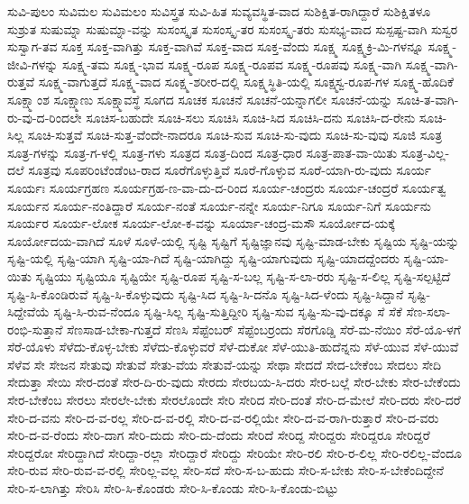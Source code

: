 ಸುವಿ-ಪುಲಂ
ಸುವಿಮಲ
ಸುವಿಮಲಂ
ಸುವಿಸ್ತ್ರತ
ಸುವಿ-ಹಿತ
ಸುವ್ಯವಸ್ಥಿತ-ವಾದ
ಸುಶಿಕ್ಷಿತ-ರಾಗಿದ್ದಾರೆ
ಸುಶಿಕ್ಷಿತಳೂ
ಸುಶ್ರುತ
ಸುಷುಮ್ನಾ
ಸುಷುಮ್ನಾ-ವನ್ನು
ಸುಸಂಸ್ಕೃತ
ಸುಸಂಸ್ಕೃ-ತರ
ಸುಸಂಸ್ಕೃ-ತರು
ಸುಸಭ್ಯ-ವಾದ
ಸುಸ್ಪಷ್ಟ-ವಾಗಿ
ಸುಸ್ವರ
ಸುಸ್ವಾಗ-ತವ
ಸೂಕ್ತ
ಸೂಕ್ತ-ವಾಗಿತ್ತು
ಸೂಕ್ತ-ವಾಗಿವೆ
ಸೂಕ್ತ-ವಾದ
ಸೂಕ್ತ-ವೆಂದು
ಸೂಕ್ಷ್ಮ
ಸೂಕ್ಷ್ಮಕ್ರಿ-ಮಿ-ಗಳನ್ನೂ
ಸೂಕ್ಷ್ಮ-ಜೀವಿ-ಗಳನ್ನು
ಸೂಕ್ಷ್ಮ-ತಮ
ಸೂಕ್ಷ್ಮ-ಭಾವ
ಸೂಕ್ಷ್ಮ-ರೂಪ
ಸೂಕ್ಷ್ಮ-ರೂಪವ
ಸೂಕ್ಷ್ಮ-ರೂಪವು
ಸೂಕ್ಷ್ಮ-ವಾಗಿ
ಸೂಕ್ಷ್ಮ-ವಾಗಿ-ರುತ್ತವೆ
ಸೂಕ್ಷ್ಮ-ವಾಗುತ್ತದೆ
ಸೂಕ್ಷ್ಮ-ವಾದ
ಸೂಕ್ಷ್ಮ-ಶರೀರ-ದಲ್ಲಿ
ಸೂಕ್ಷ್ಮಸ್ಥಿತಿ-ಯಲ್ಲಿ
ಸೂಕ್ಷ್ಮಸ್ವ-ರೂಪ-ಗಳ
ಸೂಕ್ಷ್ಮ-ಹೊದಿಕೆ
ಸೂಕ್ಷ್ಮಾಂಶ
ಸೂಕ್ಷ್ಮಾಣು
ಸೂಕ್ಷ್ಮಾವಸ್ಥೆ
ಸೂಗದ
ಸೂಚಕ
ಸೂಚನೆ
ಸೂಚನೆ-ಯನ್ನಾಗಲೀ
ಸೂಚನೆ-ಯನ್ನು
ಸೂಚಿ-ತ-ವಾಗಿ-ರು-ವು-ದ-ರಿಂದಲೇ
ಸೂಚಿಸ-ಬಹುದೇ
ಸೂಚಿ-ಸಲು
ಸೂಚಿಸಿ
ಸೂಚಿ-ಸಿದ
ಸೂಚಿಸಿ-ದನು
ಸೂಚಿಸಿ-ದ-ರೇನು
ಸೂಚಿ-ಸಿಲ್ಲ
ಸೂಚಿ-ಸುತ್ತವೆ
ಸೂಚಿ-ಸುತ್ತ-ವೆಂದೇ-ನಾದರೂ
ಸೂಚಿ-ಸುವ
ಸೂಚಿ-ಸು-ವುದು
ಸೂಚಿ-ಸು-ವುವು
ಸೂಜಿ
ಸೂತ್ರ
ಸೂತ್ರ-ಗಳನ್ನು
ಸೂತ್ರ-ಗ-ಳಲ್ಲಿ
ಸೂತ್ರ-ಗಳು
ಸೂತ್ರದ
ಸೂತ್ರ-ದಿಂದ
ಸೂತ್ರ-ಧಾರ
ಸೂತ್ರ-ಪಾತ-ವಾ-ಯಿತು
ಸೂತ್ರ-ವಿಲ್ಲ-ದಲೆ
ಸೂತ್ರವು
ಸೂಪರಿಂಟೆಂಡೆಂಟ-ರಾದ
ಸೂರೆಗೊಳ್ಳುತ್ತಿವೆ
ಸೂರೆ-ಗೊಳ್ಳುವ
ಸೂರೆ-ಯಾಗಿ-ರು-ವುದು
ಸೂರ್ಯ
ಸೂರ್ಯಃ
ಸೂರ್ಯಗ್ರಹಣ
ಸೂರ್ಯಗ್ರಹ-ಣ-ವಾ-ದು-ದ-ರಿಂದ
ಸೂರ್ಯ-ಚಂದ್ರರು
ಸೂರ್ಯ-ಚಂದ್ರರೆ
ಸೂರ್ಯತ್ವ
ಸೂರ್ಯನ
ಸೂರ್ಯ-ನಂತಿದ್ದಾರೆ
ಸೂರ್ಯ-ನಂತೆ
ಸೂರ್ಯ-ನನ್ನೇ
ಸೂರ್ಯ-ನಿಗೂ
ಸೂರ್ಯ-ನಿಗೆ
ಸೂರ್ಯನು
ಸೂರ್ಯರ
ಸೂರ್ಯ-ಲೋಕ
ಸೂರ್ಯ-ಲೋ-ಕ-ವನ್ನು
ಸೂರ್ಯಾ-ಚಂದ್ರ-ಮಸೌ
ಸೂರ್ಯೋದ-ಯಕ್ಕೆ
ಸೂರ್ಯೋದಯ-ವಾಗಿದೆ
ಸೂಳೆ
ಸೂಳೆ-ಯಲ್ಲಿ
ಸೃಷ್ಟಿ
ಸೃಷ್ಟಿಗೆ
ಸೃಷ್ಟಿಜ್ಞಾನವು
ಸೃಷ್ಟಿ-ಮಾಡ-ಬೇಕು
ಸೃಷ್ಟಿಯ
ಸೃಷ್ಟಿ-ಯನ್ನು
ಸೃಷ್ಟಿ-ಯಲ್ಲಿ
ಸೃಷ್ಟಿ-ಯಾಗಿ
ಸೃಷ್ಟಿ-ಯಾ-ಗಿದೆ
ಸೃಷ್ಟಿ-ಯಾಗಿದ್ದು
ಸೃಷ್ಟಿ-ಯಾಗುವುದು
ಸೃಷ್ಟಿ-ಯಾದದ್ದೆಂದರು
ಸೃಷ್ಟಿ-ಯಾ-ಯಿತು
ಸೃಷ್ಟಿಯು
ಸೃಷ್ಟಿಯೂ
ಸೃಷ್ಟಿಯೇ
ಸೃಷ್ಟಿ-ರೂಪ
ಸೃಷ್ಟಿ-ಸ-ಬಲ್ಲ
ಸೃಷ್ಟಿ-ಸ-ಲಾ-ರರು
ಸೃಷ್ಟಿ-ಸ-ಲಿಲ್ಲ
ಸೃಷ್ಟಿ-ಸಲ್ಪಟ್ಟಿದೆ
ಸೃಷ್ಟಿ-ಸಿ-ಕೊಂಡಿರುವೆ
ಸೃಷ್ಟಿ-ಸಿ-ಕೊಳ್ಳುವುದು
ಸೃಷ್ಟಿ-ಸಿದ
ಸೃಷ್ಟಿ-ಸಿ-ದನೊ
ಸೃಷ್ಟಿ-ಸಿದ-ಳೆಂದು
ಸೃಷ್ಟಿ-ಸಿದ್ದಾನೆ
ಸೃಷ್ಟಿ-ಸಿದ್ದೇವೆಯೆ
ಸೃಷ್ಟಿ-ಸಿ-ರುವ-ನೆಂದೂ
ಸೃಷ್ಟಿ-ಸಿಲ್ಲ
ಸೃಷ್ಟಿ-ಸುತ್ತಿದ್ದೀರಿ
ಸೃಷ್ಟಿ-ಸುವ
ಸೃಷ್ಟಿ-ಸು-ವು-ದಕ್ಕೂ
ಸೆ
ಸೆಕೆ
ಸೆಣ-ಸಲಾ-ರಂಭಿ-ಸುತ್ತಾನೆ
ಸೆಣಸಾಡ-ಬೇಕಾ-ಗುತ್ತದೆ
ಸೆಣಸಿ
ಸೆಪ್ಟೆಂಬರ್
ಸೆಪ್ಟೆಂಬರ್ರಂದು
ಸೆರಗೊಡ್ಡಿ
ಸೆರೆ-ಮ-ನೆಯಿಂ
ಸೆರೆ-ಯೊ-ಳಗೆ
ಸೆರೆ-ಯೊಳು
ಸೆಳೆದು-ಕೊಳ್ಳ-ಬೇಕು
ಸೆಳೆದು-ಕೊಳ್ಳುವರೆ
ಸೆಳೆ-ದುಕೋ
ಸೆಳೆ-ಯುತಿ-ಹುದೆನ್ನನು
ಸೆಳೆ-ಯುವ
ಸೆಳೆ-ಯುವೆ
ಸೆಳೆವ
ಸೇ
ಸೇಜನ
ಸೇತುವು
ಸೇತುವೆ
ಸೇತು-ವೆಯ
ಸೇತುವೆ-ಯನ್ನು
ಸೇಥಾ
ಸೇದದೆ
ಸೇದ-ಬೇಕೆಂಬ
ಸೇದಲು
ಸೇದಿ
ಸೇದುತ್ತಾ
ಸೇಯಿ
ಸೇರ-ದಂತೆ
ಸೇರ-ದಿ-ರು-ವುದು
ಸೇರದು
ಸೇರಬಯ-ಸಿ-ದರು
ಸೇರ-ಬಲ್ಲೆ
ಸೇರ-ಬೇಕು
ಸೇರ-ಬೇಕೆಂದು
ಸೇರ-ಬೇಕೆಂಬ
ಸೇರಲು
ಸೇರಲೇ-ಬೇಕು
ಸೇರಲೊಂದೇ
ಸೇರಿ
ಸೇರಿದ
ಸೇರಿ-ದಂತೆ
ಸೇರಿ-ದ-ಮೇಲೆ
ಸೇರಿ-ದರು
ಸೇರಿ-ದರೆ
ಸೇರಿ-ದ-ವನು
ಸೇರಿ-ದ-ವ-ರಲ್ಲ
ಸೇರಿ-ದ-ವ-ರಲ್ಲಿ
ಸೇರಿ-ದ-ವ-ರಲ್ಲಿಯೇ
ಸೇರಿ-ದ-ವ-ರಾಗಿ-ರುತ್ತಾರೆ
ಸೇರಿ-ದ-ವರು
ಸೇರಿ-ದ-ವ-ರೆಂದು
ಸೇರಿ-ದಾಗ
ಸೇರಿ-ದುದು
ಸೇರಿ-ದು-ದೆಂದು
ಸೇರಿದೆ
ಸೇರಿದ್ದ
ಸೇರಿದ್ದರು
ಸೇರಿದ್ದರೂ
ಸೇರಿದ್ದರೆ
ಸೇರಿದ್ದರೋ
ಸೇರಿದ್ದಾಗಿದೆ
ಸೇರಿದ್ದಾ-ರಲ್ಲಾ
ಸೇರಿದ್ದಾರೆ
ಸೇರಿದ್ದು
ಸೇರಿಯೇ
ಸೇರಿ-ರಲಿ
ಸೇರಿ-ರ-ಲಿಲ್ಲ
ಸೇರಿ-ರಲಿಲ್ಲ-ವೆಂದೂ
ಸೇರಿ-ರುವ
ಸೇರಿ-ರುವ-ವ-ರಲ್ಲಿ
ಸೇರಿಲ್ಲ-ವಲ್ಲ
ಸೇರಿ-ಸದೆ
ಸೇರಿ-ಸ-ಬ-ಹುದು
ಸೇರಿ-ಸ-ಬೇಕು
ಸೇರಿ-ಸ-ಬೇಕೆಂದಿದ್ದೇನೆ
ಸೇರಿ-ಸ-ಲಾಗಿತ್ತು
ಸೇರಿಸಿ
ಸೇರಿ-ಸಿ-ಕೊಂಡರು
ಸೇರಿ-ಸಿ-ಕೊಂಡು
ಸೇರಿ-ಸಿ-ಕೊಂಡು-ಬಿಟ್ಟು
